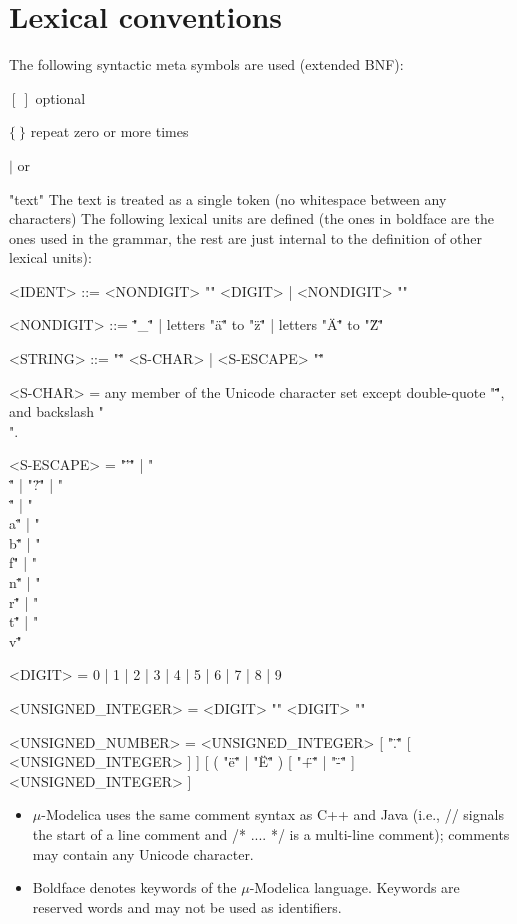 \documentclass[11pt,a4paper,notitlepage]{report}
\begin{document}
\section{Lexical conventions}
The following syntactic meta symbols are used (extended BNF):

$[\ ]$ optional

$\{\ \}$ repeat zero or more times

$|$ or

"text" The text is treated as a single token (no whitespace between any characters)
The following lexical units are defined (the ones in boldface are the ones used in the grammar, the rest are just
internal to the definition of other lexical units):
\begin{grammar}\scriptsize

<IDENT> ::= <NONDIGIT> "{" <DIGIT> | <NONDIGIT> "}"

<NONDIGIT> ::= "\"_\"" | letters "\"a\"" to "\"z\"" | letters "\"A\"" to "\"Z\""

<STRING> ::= "\"" { <S-CHAR> | <S-ESCAPE> } "\""

<S-CHAR> = any member of the Unicode character set except double-quote "\"\"\"", and backslash "\\".  

<S-ESCAPE> = "\"’\"" | "\\\"" | "\"?\"" | "\"\\\"" |
"\"\\a\"" | "\"\\b\"" | "\"\\f\"" | "\"\\n\"" | "\"\\r\"" | "\"\\t\"" | "\"\\v\""

<DIGIT> = 0 | 1 | 2 | 3 | 4 | 5 | 6 | 7 | 8 | 9

<UNSIGNED_INTEGER> = <DIGIT> "{" <DIGIT> "}"

<UNSIGNED_NUMBER> = <UNSIGNED_INTEGER> [ "\".\"" [ <UNSIGNED_INTEGER> ] ]
[ ( "\"e\"" | "\"E\"" ) [ "\"+\"" | "\"-\"" ] <UNSIGNED_INTEGER> ]

\end{grammar}

\begin{itemize}
\item $\mu$-Modelica uses the same comment syntax as C++ and Java (i.e., // signals the start of a line comment and /* .... */ is a multi-line comment); comments may contain any Unicode character. \item Boldface denotes keywords of the $\mu$-Modelica language. Keywords are reserved words and may not be used as identifiers.
\end{itemize}
\end{document}
